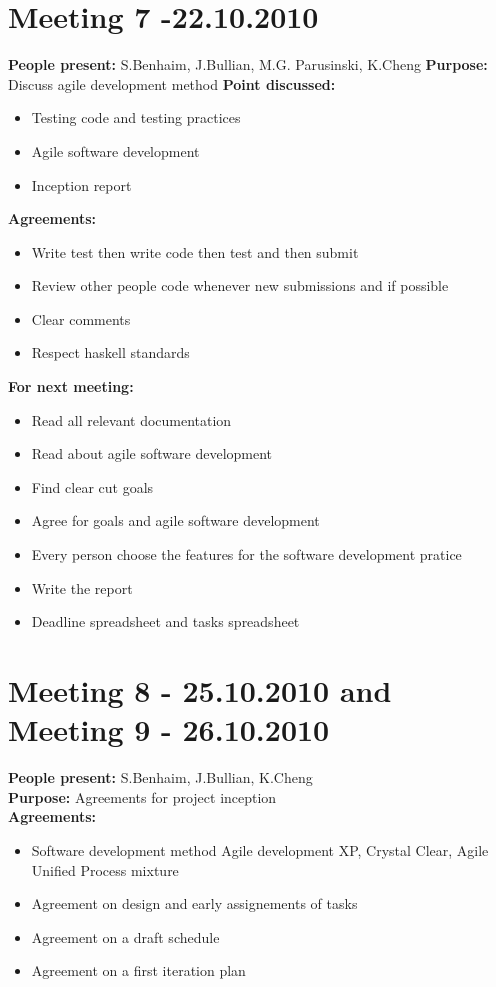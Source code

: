 \documentclass[12pt,a4paper]{article}
\begin{document}
\section*{Meeting 7 -22.10.2010}

\textbf{People present:} S.Benhaim, J.Bullian, M.G. Parusinski, K.Cheng
\textbf{Purpose:} Discuss agile development method
\textbf{Point discussed:}
\begin{itemize}
\item Testing code and testing practices
\item Agile software development
\item Inception report
\end{itemize}
\textbf{Agreements:}
\begin{itemize}
\item Write test then write code then test and then submit
\item Review other people code whenever new submissions and if possible
\item Clear comments
\item Respect haskell standards
\end{itemize}
\textbf{For next meeting:}
\begin{itemize}
\item Read all relevant documentation
\item Read about agile software development
\item Find clear cut goals
\item Agree for goals and agile software development
\item Every person choose the features for the software development pratice
\item Write the report
\item Deadline spreadsheet and tasks spreadsheet
\end{itemize}

\section*{Meeting 8 - 25.10.2010 and Meeting 9 - 26.10.2010 }

\textbf{People present:} S.Benhaim, J.Bullian, K.Cheng \\
\textbf{Purpose:} Agreements for project inception \\
\textbf{Agreements:}
\begin{itemize}
\item Software development method Agile development XP, Crystal Clear, Agile Unified Process mixture
\item Agreement on design and early assignements of tasks
\item Agreement on a draft schedule
\item Agreement on a first iteration plan
\end{itemize}
\end{document}
